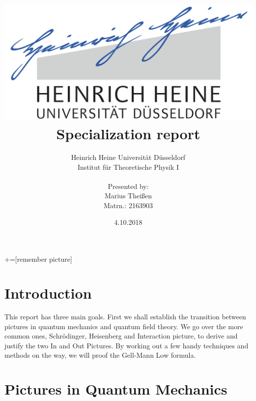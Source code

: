 \documentclass[12pt, titlepage]{article}
\title{\includegraphics[scale=0.07]{logo}\\Specialization report}
\date{4.10.2018}
\author{ Heinrich Heine Universit\"at D\"usseldorf\\ Institut f\"ur Theoretische Physik I\\  \\Presented by:\\Marius Thei\ss{}en\\ Matrn.: 2163903 \\  }
\begin{document}
+=[remember picture]
\everymath{\displaystyle}

\maketitle %
\tableofcontents
\newpage
\section{Introduction}
This report has three main goals. First we shall establish the transition between pictures in quantum mechanics and quantum field theory. We go over the more common ones, Schrödinger, Heisenberg and Interaction picture, to derive and justify the two In and Out Pictures.
By working out a few handy techniques and methods on the way, we will proof the Gell-Mann Low formula.

\section{Pictures in Quantum Mechanics }
\end{document}
